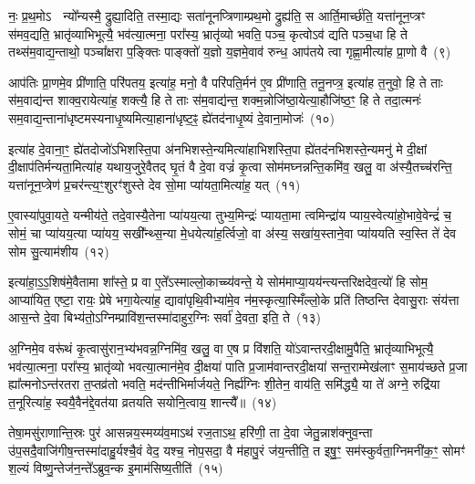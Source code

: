नः॒ प्र॒थ॒मो\-ऽ  न्यो᳚न्यस्मै॒ द्रुह्या॒दिति॒ तस्मा॒द्यः सता॑नूनप्त्रिणाम्प्रथ॒मो द्रुह्य॑ति॒ स आर्ति॒मार्च्छ॑ति॒ यत्ता॑नून॒प्त्रꣳ स॑मव॒द्यति॒ भ्रातृ॑व्याभिभूत्यै॒ भव॑त्या॒त्मना॒ परा᳚स्य॒ भ्रातृ॑व्यो भवति॒ पञ्च॒ कृत्वो\-ऽव॑ द्यति पञ्च॒धा हि ते तथ्स॑म॒वाद्य॒न्ताथो॒ पञ्चा᳚क्षरा प॒ङ्क्तिः पाङ्क्तो॑ य॒ज्ञो य॒ज्ञमे॒वाव॑ रुन्ध॒ आप॑तये त्वा गृह्णा॒मीत्या॑ह प्रा॒णो वै~(९)

आप॑तिः प्रा॒णमे॒व प्री॑णाति॒ परि॑पतय॒ इत्या॑ह॒ मनो॒ वै परि॑पति॒र्मन॑ ए॒व प्री॑णाति॒ तनू॒नप्त्र॒ इत्या॑ह त॒नुवो॒ हि ते ताः स॑म॒वाद्य॑न्त शाक्व॒रायेत्या॑ह॒ शक्त्यै॒ हि ते ताः स॑म॒वाद्य॑न्त॒ शक्म॒न्नोजि॑ष्ठा॒येत्या॒हौजि॑ष्ठ॒ꣳ॒ हि ते तदा॒त्मनः॑ सम॒वाद्य॒न्ताना॑धृष्टमस्यनाधृ॒ष्यमित्या॒हाना॑धृष्ट॒ꣴ॒ ह्ये॑तद॑नाधृ॒ष्यं दे॒वाना॒मोजः॑~(१०)

इत्या॑ह दे॒वाना॒ꣳ॒ ह्ये॑तदोजो॑\-ऽभिशस्ति॒पा अ॑नभिशस्ते॒न्यमित्या॑हाभिशस्ति॒पा ह्ये॑तद॑नभिशस्ते॒न्यमनु॑ मे दी॒क्षां दी॒क्षाप॑तिर्मन्यता॒मित्या॑ह यथाय॒जुरे॒वैतद् घृ॒तं वै दे॒वा वज्रं॑ कृ॒त्वा सोम॑मघ्नन्नन्ति॒कमि॑व॒ खलु॒ वा अ॑स्यै॒तच्च॑रन्ति॒ यत्ता॑नून॒प्त्रेण॑ प्र॒चर॑न्त्य॒ꣳ॒शुरꣳ॑शुस्ते देव सो॒मा प्या॑यता॒मित्या॑ह॒ यत्~(११)

ए॒वास्या॑पुवा॒यते॒ यन्मीय॑ते॒ तदे॒वास्यै॒तेना प्या॑यय॒त्या तुभ्य॒मिन्द्रः॑ प्यायता॒मा त्वमिन्द्रा॑य प्याय॒स्वेत्या॑हो॒भावे॒वेन्द्रं॑ च॒ सोमं॒ चा प्या॑यय॒त्या प्या॑यय॒ सखी᳚न्थ्स॒न्या मे॒धयेत्या॑ह॒र्त्विजो॒ वा अ॑स्य॒ सखा॑य॒स्ताने॒वा प्या॑ययति स्व॒स्ति ते॑ देव सोम सु॒त्याम॑शीय~(१२)

इत्या॑हा॒ऽ॒ऽ॒शिष॑मे॒वैतामा शा᳚स्ते॒ प्र वा ए॒ते᳚\-ऽस्माल्लो॒काच्च्य॑वन्ते॒ ये सोम॑माप्या॒यय॑न्त्यन्तरिक्षदेव॒त्यो॑ हि सोम॒ आप्या॑यित॒ एष्टा॒ रायः॒ प्रेषे भगा॒येत्या॑ह॒ द्यावा॑पृथि॒वीभ्या॑मे॒व न॑म॒स्कृत्या॒स्मिँल्लो॒के प्रति॑ तिष्ठन्ति देवासु॒राः संय॑त्ता आस॒न्ते दे॒वा बिभ्य॑तो॒\-ऽग्निम्प्रावि॑श॒न्तस्मा॑दाहुर॒ग्निः सर्वा॑ दे॒वता॒ इति॒ ते~(१३)

अ॒ग्निमे॒व वरू॑थं कृ॒त्वासु॑रान॒भ्य॑भवन्न॒ग्निमि॑व॒ खलु॒ वा ए॒ष प्र वि॑शति॒ यो॑\-ऽवान्तरदी॒क्षामु॒पैति॒ भ्रातृ॑व्याभिभूत्यै॒ भव॑त्या॒त्मना॒ परा᳚स्य॒ भ्रातृ॑व्यो भवत्या॒त्मान॑मे॒व दी॒क्षया॑ पाति प्र॒जाम॑वान्तरदी॒क्षया॑ सन्त॒राम्मेख॑लाꣳ स॒माय॑च्छते प्र॒जा ह्या᳚त्मनो\-ऽन्त॑रतरा त॒प्तव्र॑तो भवति॒ मद॑न्तीभिर्मार्जयते॒ निर्\mbox{}ह्य॑ग्निः शी॒तेन॒ वाय॑ति॒ समि॑द्ध्यै॒ या ते॑ अग्ने॒ रुद्रि॑या त॒नूरित्या॑ह॒ स्वयै॒वैन॑द्दे॒वत॑या व्रतयति सयोनि॒त्वाय॒ शान्त्यै᳚॥~(१४)

{\anuvakamend[{यो वा ओज॑ आह॒ यद॑शी॒येति॒ ते᳚\-ऽग्न॒ एका॑\-दश च}]}%

तेषा॒मसु॑राणान्ति॒स्रः पुर॑ आसन्नय॒स्मय्य॑व॒मा\-ऽथ॑ रज॒ता\-ऽथ॒ हरि॑णी॒ ता दे॒वा जेतु॒न्नाश॑क्नुव॒न्ता उ॑प॒सदै॒वाजि॑गीष॒न्तस्मा॑दाहु॒र्यश्चै॒वं वेद॒ यश्च॒ नोप॒सदा॒ वै म॑हापु॒रं ज॑य॒न्तीति॒ त इषु॒ꣳ॒ सम॑स्कुर्वता॒ग्निमनी॑क॒ꣳ॒ सोमꣳ॑ श॒ल्यं विष्णु॒न्तेज॑न॒न्ते᳚\-ऽब्रुव॒न्क इ॒माम॑सिष्य॒तीति॑~(१५)


